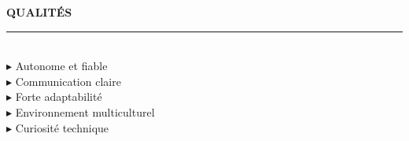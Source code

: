 \documentclass[a4paper,10pt]{article}
\newlength{\secbefore}\setlength{\secbefore}{6pt}
\newlength{\secafter}\setlength{\secafter}{4pt}
\newcommand{\sidesection}[1]{%
    \vspace{\secbefore}%
    {\footnotesize\bfseries\color{accent}\MakeUppercase{\hspace{1pt}#1}}\\[1pt]%
    {\color{accent}\rule{3.6cm}{1.5pt}}\\[\secafter]%
}
\begin{document}
\begin{minipage}[t]{5.4cm}
\begin{minipage}[t]{4.8cm}
\sidesection{Qualit\'es}
\footnotesize
{\color{accent}$\blacktriangleright$}\hspace{4pt} Autonome et fiable\\[3pt]
{\color{accent}$\blacktriangleright$}\hspace{4pt} Communication claire\\[3pt]
{\color{accent}$\blacktriangleright$}\hspace{4pt} Forte adaptabilit\'e\\[3pt]
{\color{accent}$\blacktriangleright$}\hspace{4pt} Environnement multiculturel\\[3pt]
{\color{accent}$\blacktriangleright$}\hspace{4pt} Curiosit\'e technique

\end{minipage}
\end{minipage}%
\hspace{2.2cm}%
\end{document}
